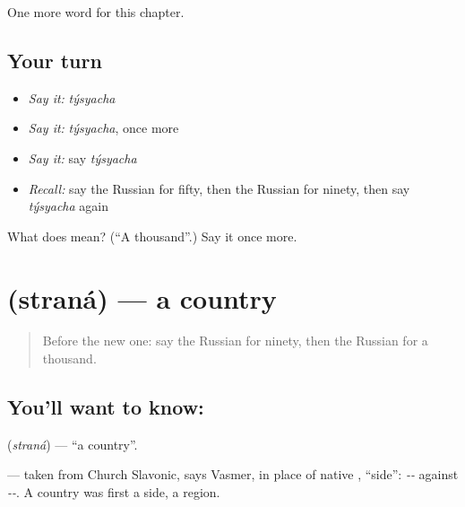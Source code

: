 \begin{grammarlens}[title={What you've built}]
One more word for this chapter.
\end{grammarlens}

\subsection*{Your turn}
\begin{itemize}
\raggedright
  \item \emph{Say it:} \emph{týsyacha}
  \item \emph{Say it:} \emph{týsyacha}, once more
  \item \emph{Say it:} say \emph{týsyacha}
  \item \emph{Recall:} say the Russian for fifty, then the Russian for ninety, then say \emph{týsyacha} again
\end{itemize}

\begin{tcolorbox}[breakable,colback=teal!4,colframe=teal!35!black,title={Before you move on}]
What does  mean? (\textquotedblleft{}A thousand\textquotedblright{}.) Say it once more.
\end{tcolorbox}
\section[\texorpdfstring{\ru{страна} (straná)}{страна (straná)}]{ (straná) — a country}

\label{lesson:RU-C76-country}



\begin{quote}
Before the new one: say the Russian for ninety, then the Russian for a thousand.
\end{quote}

\subsection*{You'll want to know: }
\textbf{} (\emph{straná}) — \textquotedblleft{}a country\textquotedblright{}.

\begin{cousinweb}
\textbf{} — taken from Church Slavonic, says Vasmer, in place of native \emph{}, \textquotedblleft{}side\textquotedblright{}: \emph{--} against \emph{--}. A country was first a side, a region.
\end{cousinweb}

